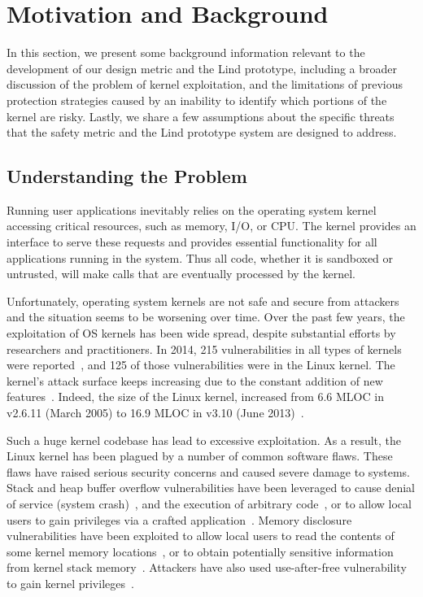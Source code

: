 \section{Motivation and Background}
\label{sec.motivation-and-background}

In this section, we present some background information 
relevant to the development of our design metric and the Lind prototype, 
including a broader discussion of the problem of kernel exploitation, 
and the limitations of previous protection strategies caused by 
an inability to identify which portions of the kernel are risky. 
Lastly, we share a few assumptions about the specific threats 
that the safety metric and the Lind prototype system are designed to
address.

\subsection{Understanding the Problem}

Running user applications inevitably relies on the operating system kernel 
accessing critical resources, such as memory, I/O, or CPU. 
The kernel provides an interface to serve these requests 
and provides essential functionality for all applications running in the
system. 
Thus all code, whether it is sandboxed or untrusted, will make calls 
that are eventually processed by the kernel. 

Unfortunately, operating system kernels are not safe and secure from
attackers and the situation seems to be worsening over time. 
Over the past few years, the exploitation of OS kernels has been wide
spread, 
despite substantial efforts by researchers and practitioners. 
In 2014, 215 vulnerabilities in all types of kernels were reported~\cite{NVD}, 
and 125 of those vulnerabilities were in the Linux kernel. 
The kernel's
attack surface keeps increasing due to the constant addition of new
features~\cite{Metrics-13}. 
Indeed, the size of the Linux kernel, increased from 6.6 MLOC in v2.6.11 
(March 2005) to 16.9 MLOC in v3.10 (June 2013)~\cite{Linux-13}. 


Such a huge kernel codebase has lead to excessive exploitation. 
As a result, the Linux kernel has been plagued by a number of common
software flaws. 
These flaws have raised serious security concerns and caused severe damage
to systems. 
Stack and heap buffer overflow vulnerabilities have been leveraged to 
cause denial of service (system crash)~\cite{CVE-2009-3234},
\cite{CVE-2013-2892} and the execution of arbitrary 
code~\cite{CVE-2009-3234}, 
or to allow local users to gain privileges via a crafted 
application~\cite{CVE-2013-1828}. 
Memory disclosure vulnerabilities have been exploited to allow local users
to read 
the contents of some kernel memory locations~\cite{CVE-2009-3002}, or to
obtain potentially 
sensitive information from kernel stack memory~\cite{CVE-2010-4073}. 
Attackers have also used use-after-free vulnerability to gain kernel
privileges~\cite{CVE-2013-4343}.

